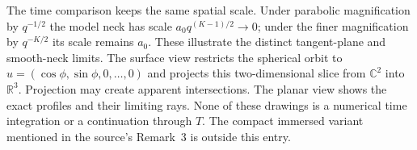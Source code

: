 \begin{example}
The time comparison keeps the same spatial scale. Under parabolic magnification by $q^{-1/2}$ the model neck has scale $a_0q^{(K-1)/2}\to0$; under the finer magnification by $q^{-K/2}$ its scale remains $a_0$. These illustrate the distinct tangent-plane and smooth-neck limits. The surface view restricts the spherical orbit to $u=(\cos\phi,\sin\phi,0,\ldots,0)$ and projects this two-dimensional slice from $\mathbb C^2$ into $\mathbb R^3$. Projection may create apparent intersections. The planar view shows the exact profiles and their limiting rays. None of these drawings is a numerical time integration or a continuation through $T$. The compact immersed variant mentioned in the source's Remark~3 is outside this entry.
\end{example}
